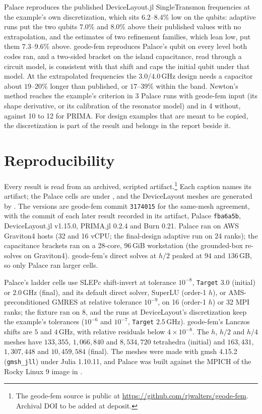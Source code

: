 \documentclass{anvil-paper}
\begin{document}
Palace reproduces the published DeviceLayout.jl SingleTransmon
frequencies at the example's own discretization, which sits $6.2$--$8.4\%$
low on the qubits: adaptive runs put the two qubits $7.0\%$ and $8.0\%$
above their published values with no extrapolation, and the estimates of
two refinement families, which lean low, put them $7.3$--$9.6\%$ above. geode-fem
reproduces Palace's qubit on every level both codes ran, and a two-sided
bracket on the island capacitance, read through a circuit model, is
consistent with that shift and caps the initial qubit under that model. At
the extrapolated frequencies the $3.0$/$4.0$\,GHz design needs a capacitor
about $19$--$20\%$ longer than published, or $17$--$39\%$ within the band.
Newton's method reaches the
example's criterion in 3 Palace runs with geode-fem input (its shape
derivative, or its calibration of the resonator model) and in 4 without,
against 10 to 12 for PRIMA. For design examples that are meant to be
copied, the discretization is part of the result and belongs in the report
beside it.

\section{Reproducibility}
\label{sec:repro}

Every result is read from an archived, scripted artifact.\footnote{The geode-fem source is public at
\url{https://github.com/rjwalters/geode-fem}. Archival DOI to be added at
deposit.}
Each caption names its artifact; the Palace cells are under
, and the DeviceLayout meshes are
generated by . The versions are geode-fem commit
\texttt{3174015} for the same-mesh agreement, with the commit of each later
result recorded in its artifact, Palace \texttt{fba6a5b}, DeviceLayout.jl
v1.15.0, PRIMA.jl 0.2.4 and Burn 0.21. Palace ran on AWS
Graviton4 hosts (32 and 16 vCPU; the final-design adaptive run on 24
ranks); the capacitance brackets ran on a 28-core, 96\,GiB workstation (the
grounded-box re-solves on Graviton4). geode-fem's
direct solves at $h/2$ peaked at $94$ and $136$\,GB, so only Palace ran
larger cells.

Palace's ladder cells use SLEPc shift-invert at tolerance $10^{-8}$,
\texttt{Target} $3.0$ (initial) or $2.0$\,GHz (final), and its default
direct solver, SuperLU (order-1 $h$), or AMS-preconditioned GMRES at relative
tolerance $10^{-9}$, on 16 (order-1 $h$) or 32 MPI ranks; the fixture ran
on 8, and the runs at DeviceLayout's discretization keep the example's
tolerances ($10^{-6}$ and $10^{-7}$, \texttt{Target} $2.5$\,GHz). geode-fem's Lanczos shifts are
$5$ and $4$\,GHz, with relative residuals below $4\times10^{-8}$.
The $h$, $h/2$ and $h/4$ meshes have $133{,}355$, $1{,}066{,}840$ and
$8{,}534{,}720$ tetrahedra (initial) and $163{,}431$, $1{,}307{,}448$ and
$10{,}459{,}584$ (final). The meshes were made
with gmsh 4.15.2 (\texttt{gmsh\_jll}) under Julia 1.10.11, and Palace was
built against the MPICH of the Rocky Linux 9 image in
.
\end{document}

